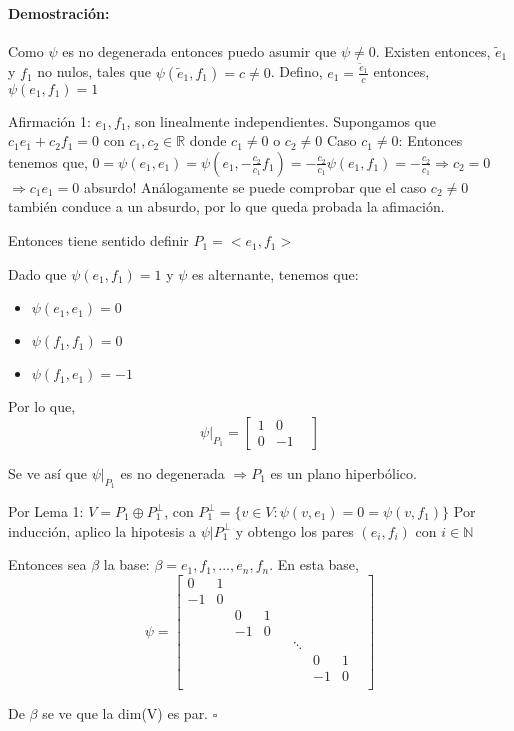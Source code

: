 \documentclass[12pt]{article}
\newenvironment{proof}{\paragraph{Demostración:}}{\hfill$\square$}
\begin{document}
\begin{proof}
Como $\psi$ es no degenerada entonces puedo asumir que $\psi \neq 0$.
Existen entonces, $\tilde{e}_1$ y $f_1$ no nulos, tales que $\psi(\tilde{e}_1,f_1)=c\neq0$.\newline
Defino, $e_1=\frac{\tilde{e}_1}{c}$ entonces, $\psi(e_1,f_1)=1$

Afirmación 1: $e_1,f_1$, son linealmente independientes.\newline
Supongamos que  $c_1 e_1 +c_2 f_1 = 0$ con $c_1,c_2 \in \mathbb{R}$  donde $c_1\neq0$ o  $c_2\neq0$\newline
Caso $c_1\neq0$:
Entonces tenemos que,
$0=\psi(e_1,e_1)=\psi(e_1,- \frac{c_2}{c_1} f_1)= - \frac{c_2}{c_1} \psi(e_1,f_1)=- \frac{c_2}{c_1} \Rightarrow c_2=0$
$\Rightarrow c_1 e_1 = 0$ absurdo!
Análogamente se puede comprobar que el caso $c_2\neq0$ también conduce a un absurdo, por lo que queda probada la
afimación.

Entonces tiene sentido definir $P_1=<e_1,f_1>$
    
Dado que $\psi(e_1,f_1)=1$ y $\psi$ es alternante, tenemos que:
\begin{itemize}
 \item $\psi(e_1,e_1)=0$
 \item $\psi(f_1,f_1)=0$
 \item $\psi(f_1,e_1)=-1$
\end{itemize}

Por lo que, 
$$\psi|_{P_1} = 
\begin{bmatrix}
 1 & 0 &\\ 
 0& -1&
\end{bmatrix}
$$

Se ve así que $\psi|_{P_1}$ es no degenerada $\Rightarrow P_1$ es un plano hiperbólico.

Por Lema 1: $V=P_1 \oplus P_1^{\bot}$, con $P_1^{\bot}=\{v \in V : \psi(v,e_1)=0=\psi(v,f_1)\}$
Por inducción, aplico la hipotesis a $\psi|P_1^{\bot}$ y obtengo los pares $(e_i,f_i)$ con $i \in \mathbb{N}$

Entonces sea $\beta$ la base: $\beta={e_1,f_1,...,e_n,f_n}$.
En esta base, 
$$\psi = 
\begin{bmatrix}
 0 & 1 & & & & & & &\\ 
 -1& 0 & & & & & & &\\
 & & 0 & 1 & & & & &\\
 & & -1 & 0 & & & & &\\
 & &  &  & & \ddots & & &\\
 & &  &  & & & 0 & 1 &\\
 & &  &  & & & -1 & 0 &\\ 
\end{bmatrix}
$$

De $\beta$ se ve que la dim(V) es par. 
\end{proof}
\end{document}
